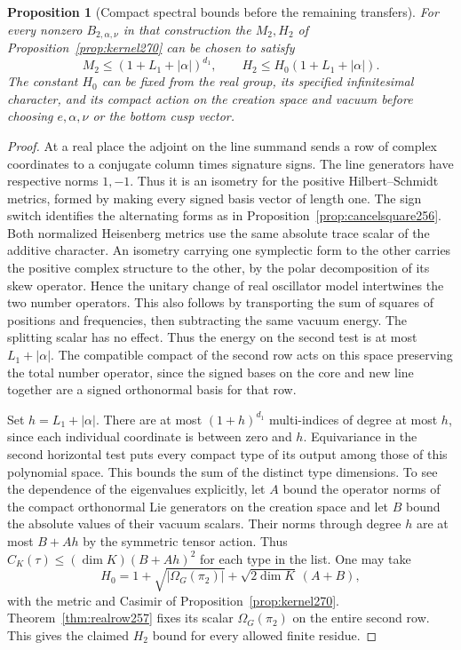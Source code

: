 \documentclass[a4paper,11pt]{article}
\newtheorem{proposition}{Proposition}[section]
\theoremstyle{definition}
\theoremstyle{remark}
\numberwithin{equation}{section}
\begin{document}
\begin{proposition}[Compact spectral bounds before the remaining transfers]\leavevmode
\label{prop:spectrum271}
For every nonzero \(B_{2,\alpha,\nu}\) in that construction
the \(M_2,H_2\) of Proposition~\ref{prop:kernel270} can be
chosen to satisfy
\[
 M_2\le(1+L_1+|\alpha|)^{d_1},\qquad
 H_2\le H_0(1+L_1+|\alpha|).
\]
The constant \(H_0\) can be fixed from the real group, its
specified infinitesimal character, and its compact action on
the creation space and vacuum before choosing \(e,\alpha,\nu\)
or the bottom cusp vector.
\end{proposition}
\begin{proof}
At a real place the adjoint on the line summand sends a row
of complex coordinates to a conjugate column times signature
signs. The line generators have respective norms \(1,-1\).
Thus it is an isometry for the positive Hilbert--Schmidt
metrics, formed by making every signed basis vector of length
one. The sign switch identifies the alternating forms as in
Proposition~\ref{prop:cancelsquare256}. Both normalized
Heisenberg metrics use the same absolute trace scalar of the
additive character. An isometry carrying one symplectic form
to the other carries the positive complex structure to the
other, by the polar decomposition of its skew operator. Hence
the unitary change of real oscillator model intertwines the
two number operators. This also follows by transporting the
sum of squares of positions and frequencies, then subtracting
the same vacuum energy. The splitting scalar has no effect.
Thus the energy on the second test is at most \(L_1+|\alpha|\).
The compatible compact of the second row acts on this space
preserving the total number operator, since the signed bases
on the core and new line together are a signed orthonormal
basis for that row.

Set \(h=L_1+|\alpha|\). There are at most \((1+h)^{d_1}\)
multi-indices of degree at most \(h\), since each individual
coordinate is between zero and \(h\). Equivariance in the
second horizontal test puts every compact type of its output
among those of this polynomial space. This bounds the sum
of the distinct type dimensions. To see the dependence of
the eigenvalues explicitly, let \(A\) bound the operator norms
of the compact orthonormal Lie generators on the creation
space and let \(B\) bound the absolute values of their
vacuum scalars. Their norms through degree \(h\) are at most
\(B+Ah\) by the symmetric tensor action. Thus
\(C_K(\tau)\le(\dim K)(B+Ah)^2\) for each type in the list.
One may take
\[
       H_0=1+\sqrt{|\Omega_G(\pi_2)|}
                       +\sqrt{2\dim K}\,(A+B),
\]
with the metric and Casimir of Proposition~\ref{prop:kernel270}.
Theorem~\ref{thm:realrow257} fixes its scalar
\(\Omega_G(\pi_2)\) on the entire second row. This gives the
claimed \(H_2\) bound for every allowed finite residue.
\end{proof}
\end{document}
